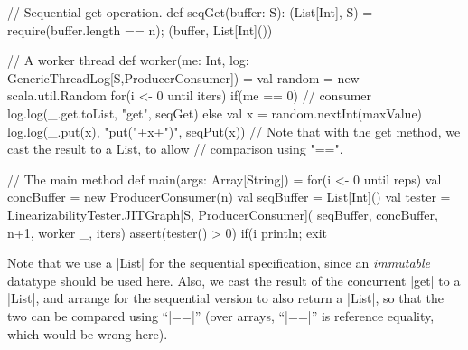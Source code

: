 \begin{answer}
\begin{scala}
{  // Sequential get operation.
  def seqGet(buffer: S): (List[Int], S) = {
    require(buffer.length == n); (buffer, List[Int]())
  }

  // A worker thread
  def worker(me: Int, log: GenericThreadLog[S,ProducerConsumer]) = {
    val random = new scala.util.Random
    for(i <- 0 until iters){
      if(me == 0) // consumer
        log.log(_.get.toList, "get", seqGet)
      else{
        val x = random.nextInt(maxValue)
        log.log(_.put(x), "put("+x+")", seqPut(x))
      }
    }
  }
  // Note that with the get method, we cast the result to a List, to allow
  // comparison using "==".

  // The main method
  def main(args: Array[String]) = {
    for(i <- 0 until reps){
      val concBuffer = new ProducerConsumer(n)
      val seqBuffer = List[Int]()
      val tester = LinearizabilityTester.JITGraph[S, ProducerConsumer](
        seqBuffer, concBuffer, n+1, worker _, iters)
      assert(tester() > 0)
      if(i%
    }
    println; exit
  }
}
\end{scala}
%
Note that we use a |List| for the sequential specification, since an
\emph{immutable} datatype should be used here.  Also, we cast the result of
the concurrent |get| to a |List|, and arrange for the sequential version to
also return a |List|, so that the two can be compared using ``|==|'' (over
arrays, ``|==|'' is reference equality, which would be wrong here). 
\end{answer}
